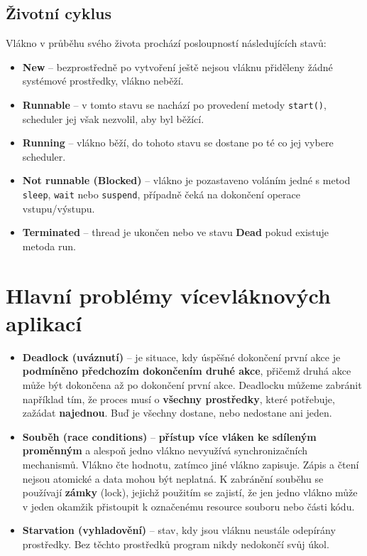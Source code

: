 \subsection{Životní cyklus}
Vlákno v průběhu svého života prochází posloupností následujících stavů:
\begin{itemize}
    \item \textbf{New} -- bezprostředně po vytvoření ještě nejsou vláknu přiděleny žádné systémové prostředky, vlákno neběží.
    \item \textbf{Runnable} -- v tomto stavu se nachází po provedení metody \texttt{start()}, scheduler jej však nezvolil, aby byl běžící.
    \item \textbf{Running} -- vlákno běží, do tohoto stavu se dostane po té co jej vybere scheduler.
    \item \textbf{Not runnable (Blocked)} -- vlákno je pozastaveno voláním jedné s metod \texttt{sleep}, \texttt{wait} nebo \texttt{suspend}, případně čeká na dokončení operace vstupu/výstupu.
    \item \textbf{Terminated} -- thread je ukončen nebo ve stavu \textbf{Dead} pokud existuje metoda run.
\end{itemize}

\section{Hlavní problémy vícevláknových aplikací}
\begin{itemize}
    \item \textbf{Deadlock (uváznutí)} -- je situace, kdy úspěšné dokončení první akce je \textbf{podmíněno předchozím dokončením druhé akce}, přičemž druhá akce může být dokončena až po dokončení první akce. Deadlocku můžeme zabránit například tím, že proces musí o \textbf{všechny prostředky}, které potřebuje, zažádat \textbf{najednou}. Buď je všechny dostane, nebo nedostane ani jeden.
    \item \textbf{Souběh (race conditions)} -- \textbf{přístup více vláken ke sdíleným proměnným} a alespoň jedno vlákno nevyužívá synchronizačních mechanismů. Vlákno čte hodnotu, zatímco jiné vlákno zapisuje. Zápis a čtení nejsou atomické a data mohou být neplatná. K zabránění souběhu se používají \textbf{zámky} (lock), jejichž použitím se zajistí, že jen jedno vlákno může v jeden okamžik přistoupit k označenému resource souboru nebo části kódu.
    \item \textbf{Starvation (vyhladovění)} -- stav, kdy jsou vláknu neustále odepírány prostředky. Bez těchto prostředků program nikdy nedokončí svůj úkol.
\end{itemize}

